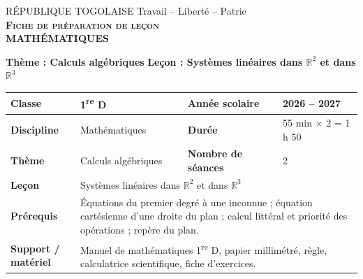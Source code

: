 \documentclass[a4paper,11pt]{article}
\begin{document}
\begin{center}
  {\small RÉPUBLIQUE TOGOLAISE \quad\textbullet\quad Travail -- Liberté -- Patrie}\\[4pt]
  {\large\textbf{\textsc{Fiche de préparation de leçon}}}\\[2pt]
  {\large\textbf{MATHÉMATIQUES}}
\end{center}

\vspace{4pt}
\noindent\colorbox{entete}{%
  \parbox[c][1.15cm][c]{\dimexpr\linewidth-2\fboxsep\relax}{%
    \centering\color{white}%
    {\Large\textbf{Thème : Calculs algébriques}}\quad{\large\textbf{--}}\quad
    {\Large\textbf{Leçon : Systèmes linéaires dans $\mathbb{R}^2$ et dans $\mathbb{R}^3$}}%
  }%
}

\vspace{6pt}
\noindent
\begin{tabularx}{\textwidth}{|>{\bfseries}p{3.1cm}|X|>{\bfseries}p{3.1cm}|X|}
\hline
Classe & 1\textsuperscript{re} D & Année scolaire & 2026 -- 2027 \\
\hline
Discipline & Mathématiques & Durée & 55 min $\times$ 2 = 1 h 50 \\
\hline
Thème & Calculs algébriques & Nombre de séances & 2 \\
\hline
Leçon & \multicolumn{3}{p{0.62\textwidth}|}{Systèmes linéaires dans $\mathbb{R}^2$ et dans $\mathbb{R}^3$} \\
\hline
Prérequis & \multicolumn{3}{p{0.62\textwidth}|}{%
  Équations du premier degré à une inconnue ; équation cartésienne d'une droite
  du plan ; calcul littéral et priorité des opérations ; repère du plan.} \\
\hline
Support / matériel & \multicolumn{3}{p{0.62\textwidth}|}{%
  Manuel de mathématiques 1\textsuperscript{re} D, papier millimétré, règle,
  calculatrice scientifique, fiche d'exercices.} \\
\hline
\end{tabularx}

\vspace{6pt}
\end{document}

